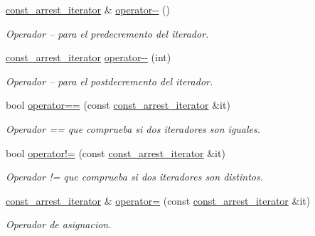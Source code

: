\begin{DoxyCompactItemize}
\hyperlink{classconjunto_1_1const__arrest__iterator}{const\-\_\-arrest\-\_\-iterator} \& \hyperlink{classconjunto_1_1const__arrest__iterator_a15ab84ae50223ef43130a0fa837ce03d}{operator-\/-\/} ()
\begin{DoxyCompactList}\small\item\em Operador -- para el predecremento del iterador. \end{DoxyCompactList}\item 
\hyperlink{classconjunto_1_1const__arrest__iterator}{const\-\_\-arrest\-\_\-iterator} \hyperlink{classconjunto_1_1const__arrest__iterator_aa08985a35c1ed2a513bb4efa24de0f88}{operator-\/-\/} (int)
\begin{DoxyCompactList}\small\item\em Operador -- para el postdecremento del iterador. \end{DoxyCompactList}\item 
bool \hyperlink{classconjunto_1_1const__arrest__iterator_a4327195351ce147dcdd578166f08c600}{operator==} (const \hyperlink{classconjunto_1_1const__arrest__iterator}{const\-\_\-arrest\-\_\-iterator} \&it)
\begin{DoxyCompactList}\small\item\em Operador == que comprueba si dos iteradores son iguales. \end{DoxyCompactList}\item 
bool \hyperlink{classconjunto_1_1const__arrest__iterator_a87c38b9da66b0c11c14b2fabc39101c2}{operator!=} (const \hyperlink{classconjunto_1_1const__arrest__iterator}{const\-\_\-arrest\-\_\-iterator} \&it)
\begin{DoxyCompactList}\small\item\em Operador != que comprueba si dos iteradores son distintos. \end{DoxyCompactList}\item 
\hyperlink{classconjunto_1_1const__arrest__iterator}{const\-\_\-arrest\-\_\-iterator} \& \hyperlink{classconjunto_1_1const__arrest__iterator_ae88cc243c3bf808c710e889cbc92fa3b}{operator=} (const \hyperlink{classconjunto_1_1const__arrest__iterator}{const\-\_\-arrest\-\_\-iterator} \&it)
\begin{DoxyCompactList}\small\item\em Operador de asignacion. \end{DoxyCompactList}\end{DoxyCompactItemize}
